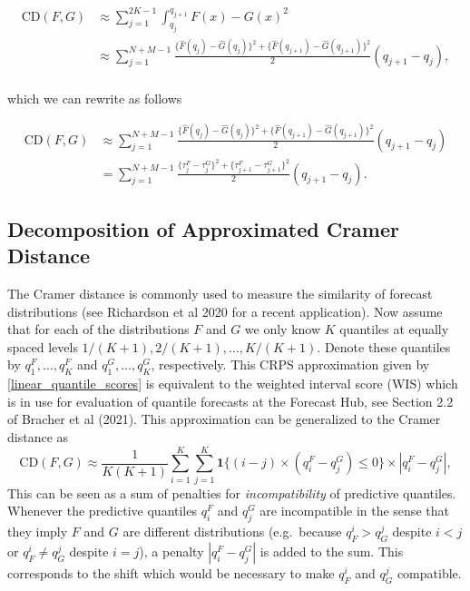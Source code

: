 \documentclass[
]{article}
\begin{document}
\begin{align}
\text{CD}(F,G) &\approx\sum^{2K-1}_{j=1}\int^{q_{j+1}}_{q_j}{F(x)−G(x)}^2\\
&\approx\sum^{N+M-1}_{j=1}\frac{\{\hat{F}(q_j)-\hat{G}(q_j)\}^2+\{\hat{F}(q_{j+1})-\hat{G}(q_{j+1})\}^2}{2}(q_{j+1}-q_{j}),\\
\end{align}

which we can rewrite as follows

\begin{align}
\text{CD}(F,G) 
&\approx\sum^{N+M-1}_{j=1}\frac{\{\hat{F}(q_j)-\hat{G}(q_j)\}^2+\{\hat{F}(q_{j+1})-\hat{G}(q_{j+1})\}^2}{2}(q_{j+1}-q_{j})\\
&=
\sum^{N+M-1}_{j=1}\frac{\{\tau^F_j-\tau^G_j\}^2+\{\tau^F_{j+1}-\tau^G_{j+1}\}^2}{2}(q_{j+1}-q_{j}).
\end{align}

\hypertarget{decomposition-of-approximated-cramer-distance}{%
\subsection{Decomposition of Approximated Cramer
Distance}\label{decomposition-of-approximated-cramer-distance}}

The Cramer distance is commonly used to measure the similarity of
forecast distributions (see Richardson et al 2020 for a recent
application). Now assume that for each of the distributions \(F\) and
\(G\) we only know \(K\) quantiles at equally spaced levels
\(1/(K + 1), 2/(K + 1), \dots, K/(K + 1)\). Denote these quantiles by
\(q^F_1, \dots, q^F_K\) and \(q^G_1, \dots, q^G_K\), respectively. This
CRPS approximation given by \eqref{linear_quantile_scores} is equivalent
to the weighted interval score (WIS) which is in use for evaluation of
quantile forecasts at the Forecast Hub, see Section 2.2 of Bracher et al
(2021). This approximation can be generalized to the Cramer distance as
\begin{equation}
\text{CD}(F, G) \approx \frac{1}{K(K + 1)}\sum_{i = 1}^K\sum_{j = 1}^K \mathbf{1}\{(i - j) \times (q^F_i - q^G_j) \leq 0\} \times \left| q^F_i - q^G_j\right|,\label{eq:approx_cd}
\end{equation} This can be seen as a sum of penalties for
\textit{incompatibility} of predictive quantiles. Whenever the
predictive quantiles \(q_i^F\) and \(q_j^G\) are incompatible in the
sense that they imply \(F\) and \(G\) are different distributions
(e.g.~because \(q_F^i > q_G^j\) despite \(i < j\) or
\(q_F^i \neq q_G^j\) despite \(i = j\)), a penalty
\(\left| q^F_i - q^G_j\right|\) is added to the sum. This corresponds to
the shift which would be necessary to make \(q_F^i\) and \(q_G^j\)
compatible.
\end{document}
